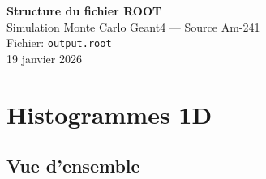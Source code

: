 \documentclass[11pt,a4paper]{article}
\begin{document}
\begin{center}
    {\LARGE\bfseries Structure du fichier ROOT}\\[0.3cm]
    {\Large Simulation Monte Carlo Geant4 --- Source Am-241}\\[0.5cm]
    {\large Fichier: \texttt{output.root}}\\[0.3cm]
    {\large 19 janvier 2026}
\end{center}

\vspace{0.5cm}

\tableofcontents

\newpage

\section{Histogrammes 1D}

\subsection{Vue d'ensemble}
\end{document}
